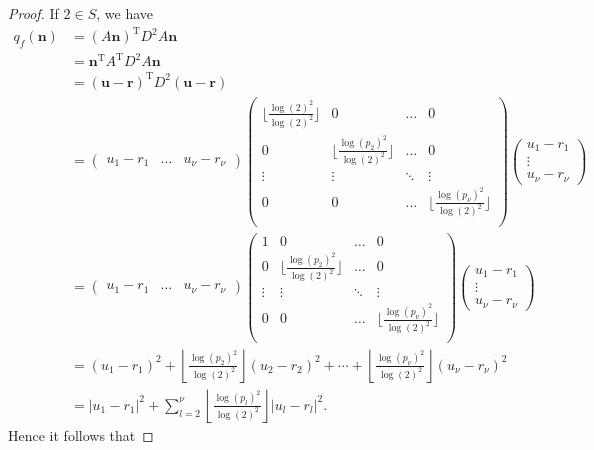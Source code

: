 \begin{proof}
If $2 \in S$, we have
\begin{align*}
q_f(\mathbf{n})	
	& = (A\mathbf{n})^{\text{T}}D^2A\mathbf{n}\\
	& = \mathbf{n}^{\text{T}}A^{\text{T}}D^2A\mathbf{n}\\
	& = (\mathbf{u} - \mathbf{r})^{\text{T}}D^2(\mathbf{u} - \mathbf{r})\\
	& = \begin{pmatrix} u_1 - r_1&  \dots & u_{\nu} - r_{\nu} \end{pmatrix} 
		\begin{pmatrix} \lfloor\frac{\log(2)^2}{\log(2)^2}\rfloor& 0 & \dots & 0\\ 0 &\lfloor\frac{\log(p_2)^2}{\log(2)^2}\rfloor & \dots & 0\\
		\vdots & \vdots & \ddots & \vdots\\ 0 & 0 & \dots & \lfloor\frac{\log(p_{\nu})^2}{\log(2)^2}\rfloor\\ 
		\end{pmatrix} 
		\begin{pmatrix} u_1 - r_1 \\  \vdots \\ u_{\nu} - r_{\nu} \end{pmatrix} \\
	& = \begin{pmatrix} u_1 - r_1&  \dots & u_{\nu} - r_{\nu} \end{pmatrix} 
		\begin{pmatrix} 1 & 0 & \dots & 0\\ 0 &\lfloor\frac{\log(p_2)^2}{\log(2)^2}\rfloor & \dots & 0\\
		\vdots & \vdots & \ddots & \vdots\\ 0 & 0 & \dots & \lfloor\frac{\log(p_{\nu})^2}{\log(2)^2}\rfloor\\ 
		\end{pmatrix} 
		\begin{pmatrix} u_1 - r_1 \\  \vdots \\ u_{\nu} - r_{\nu} \end{pmatrix} \\
	& = (u_1-r_1)^2  + \left\lfloor\frac{\log(p_2)^2}{\log(2)^2}\right\rfloor(u_2-r_2)^2 + \cdots + \left\lfloor\frac{\log(p_{\nu})^2}{\log(2)^2}\right\rfloor(u_{\nu}-r_{\nu})^2\\
	& = |u_1 - r_1|^2 + \sum_{l = 2}^{\nu}\left\lfloor\frac{\log(p_l)^2}{\log(2)^2}\right\rfloor|u_l-r_l|^2.
\end{align*}
Hence it follows that

\end{proof}
